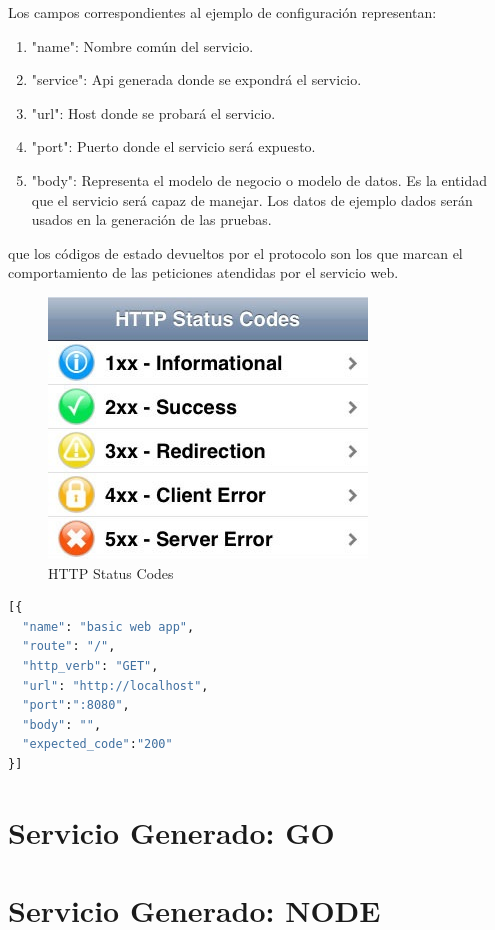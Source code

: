 \documentclass[a4paper,11pt]{book}
\begin{document}
Los campos correspondientes al ejemplo de configuración representan: 
\begin{enumerate}
\item "name": Nombre común del servicio.
\item "service": Api generada donde se expondrá el servicio.
\item "url":  Host donde se probará el servicio.
\item "port": Puerto donde el servicio será expuesto.
\item "body": Representa el modelo de negocio o modelo de datos. Es la entidad que el servicio será capaz de manejar.  Los datos de ejemplo dados serán usados en la generación de las pruebas. 
\end{enumerate}

que los códigos de estado devueltos por el protocolo son los que marcan el comportamiento de las peticiones atendidas por el servicio web. 

\begin{figure}[H]  
\centering 
\includegraphics[scale=0.35]{imagenes/http.jpg}
\caption{ HTTP Status Codes}  
\end{figure}


\begin{lstlisting}[language=python,caption={ Entrada Unitaria Configuración Generador }]
[{
  "name": "basic web app",
  "route": "/",
  "http_verb": "GET",
  "url": "http://localhost",
  "port":":8080",
  "body": "",
  "expected_code":"200"
}]
\end{lstlisting}


\section{Servicio Generado: GO}
\section{Servicio Generado: NODE}
\end{document}

